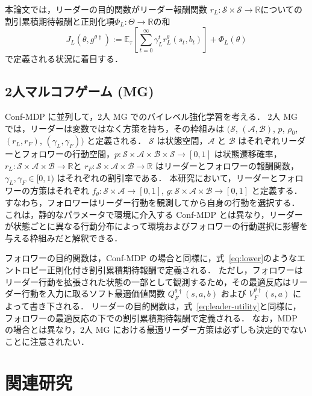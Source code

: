 \documentclass[originalpaper,fleqn]{jsaiart}     %
\providecommand{\R}{\mathbb{R}} %
\providecommand{\E}{\mathbb{E}} %
\begin{document}
本論文では，リーダーの目的関数がリーダー報酬関数 $r_L:\mathcal{S}\times\mathcal{S}\to\R$についての割引累積期待報酬と正則化項$\Phi_L:\Theta\to\R$の和
\begin{equation}
    J_L({\theta}, g^{\theta\dagger}) := \E_\tau\left[ \sum_{t=0}^\infty \gamma_L^t r_L^{\theta}(s_t, b_t)\right] + \Phi_L({\theta})\label{eq:leader-utility}
\end{equation}
で定義される状況に着目する．

\subsection{2人マルコフゲーム (MG) }

Conf-MDP に並列して，2人 MG でのバイレベル強化学習を考える．
2人 MG では，リーダーは変数ではなく方策を持ち，その枠組みは
$(\mathcal{S}$, $(\mathcal{A},\mathcal{B})$, $p$, $\rho_0$, $(r_L,r_F)$, $(\gamma_L,\gamma_F))$ と定義される．
$\mathcal{S}$ は状態空間，$\mathcal{A}$ と $\mathcal{B}$ はそれぞれリーダーとフォロワーの行動空間，$p: \mathcal{S}\times\mathcal{A}\times\mathcal{B}\times\mathcal{S}\to[0,1]$ は状態遷移確率，$r_L:\mathcal{S}\times\mathcal{A}\times\mathcal{B}\to\R$と $r_F:\mathcal{S}\times\mathcal{A}\times\mathcal{B}\to\R$ はリーダーとフォロワーの報酬関数， $\gamma_L, \gamma_F \in [0, 1)$ はそれぞれの割引率である．
本研究において，リーダーとフォロワーの方策はそれぞれ $f_{\theta}: \mathcal{S}\times\mathcal{A}\to[0,1]$, $g:\mathcal{S} \times \mathcal{A}\times\mathcal{B}\to[0,1]$ と定義する．
すなわち，フォロワーはリーダー行動を観測してから自身の行動を選択する．
これは，静的なパラメータで環境に介入する Conf-MDP とは異なり，リーダーが状態ごとに異なる行動分布によって環境およびフォロワーの行動選択に影響を与える枠組みだと解釈できる．

フォロワーの目的関数は，Conf-MDP の場合と同様に，式~\eqref{eq:lower}のようなエントロピー正則化付き割引累積期待報酬で定義される．
ただし，フォロワーはリーダー行動を拡張された状態の一部として観測するため，その最適反応はリーダー行動を入力に取るソフト最適価値関数 $Q_F^{\theta\dagger}(s,a,b)$ および $V_F^{\theta\dagger}(s,a)$ によって書き下される．
リーダーの目的関数は，式~\eqref{eq:leader-utility}と同様に，フォロワーの最適反応の下での割引累積期待報酬で定義される．
なお，MDP の場合とは異なり，2人 MG における最適リーダー方策は必ずしも決定的でないことに注意されたい．

\section{関連研究}
\end{document}
